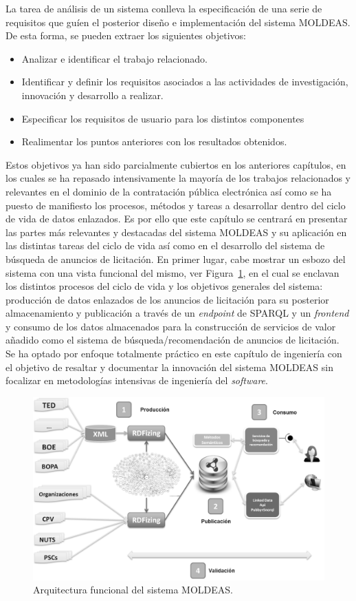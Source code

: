 La tarea de análisis de un sistema conlleva la especificación de una serie 
de requisitos que guíen el posterior diseño e implementación del sistema 
\gls{MOLDEAS}. De esta forma, se pueden extraer los siguientes objetivos: 
\begin{itemize}
 \item Analizar e identificar el trabajo relacionado.
 \item Identificar y definir los requisitos asociados a las actividades de investigación, 
innovación y desarrollo a realizar.
 \item Especificar los requisitos de usuario para los distintos componentes
 \item Realimentar los puntos anteriores con los resultados obtenidos.
\end{itemize}

Estos objetivos ya han sido parcialmente cubiertos en los anteriores 
capítulos, en los cuales se ha repasado intensivamente la mayoría de los 
trabajos relacionados y relevantes en el dominio de la contratación 
pública electrónica así como se ha puesto de manifiesto los procesos, 
métodos y tareas a desarrollar dentro del ciclo de vida de datos 
enlazados. Es por ello que este capítulo se centrará en presentar las partes más relevantes y 
destacadas del sistema MOLDEAS y su aplicación en las distintas 
tareas del ciclo de vida así como en el desarrollo del sistema de búsqueda 
de anuncios de licitación. En primer lugar, cabe mostrar un esbozo del 
sistema con una vista funcional del mismo, ver Figura~\ref{fig:functional-overview}, en el cual 
se enclavan los distintos procesos del ciclo de vida y los objetivos generales del sistema: 
producción de datos enlazados de los anuncios de licitación para su posterior 
almacenamiento y publicación a través de un \textit{endpoint} de \gls{SPARQL} y un \linkeddata \textit{frontend} y 
consumo de los datos almacenados para la construcción de servicios de valor añadido como el 
sistema de búsqueda/recomendación de anuncios de licitación. Se ha optado por enfoque 
totalmente práctico en este capítulo de ingeniería con el objetivo de resaltar y documentar la innovación del sistema 
MOLDEAS sin focalizar en metodologías intensivas de ingeniería del \textit{software}.


\begin{figure}[!htb]
\centering
	\includegraphics[width=12cm]{images/phd/moldeas/functional-overview}
\caption{Arquitectura funcional del sistema MOLDEAS.}
\label{fig:functional-overview}
\end{figure}

